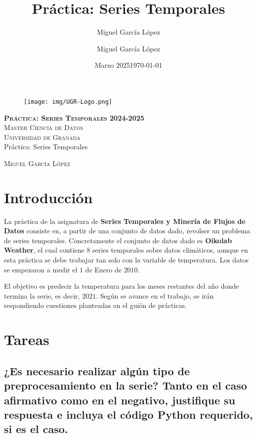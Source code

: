 \documentclass[12pt,letterpaper]{article}
\title{Práctica: Series Temporales}
\author{Miguel García López}
\date{Marzo 2025}
\author{Miguel García López} %
\date{\normalsize\today} %
\begin{document}
\begin{titlepage}
    \begin{figure}
        \vspace{-1.3cm}
        \begin{center}
            \texttt{[image: img/UGR-Logo.png]}
        \end{center}
    \end{figure}
    \vspace{1.3cm}
    \centering
    \normalfont \normalsize
    \textsc{\textbf{Práctica: Series Temporales 2024-2025} \\ \vspace{.15cm} Master Ciencia de Datos\\ \vspace{.15cm} Universidad de Granada} \\ [25pt]
    \huge Práctica: Series Temporales

    \normalfont \normalsize \vspace{.30cm}
    \textsc{Miguel García López}

\end{titlepage}

\tableofcontents
\listoffigures
\listoftables
\newpage

\section{Introducción}
La práctica de la asignatura de \textbf{Series Temporales y Minería de Flujos de Datos} consiste en, a partir de una conjunto de datos dado, revolser un problema de series temporales. Concretamente el conjunto de datos dado es \textbf{Oikolab Weather}, el cual contiene $8$ series temporales sobre datos climáticos, aunque en esta práctica se debe trabajar tan solo con la variable de temperatura. Los datos se empezaron a medir el $1$ de Enero de $2010$.

El objetivo es predecir la temperatura para los meses restantes del año donde termina la serie, es decir, $2021$. Según se avance en el trabajo, se irán respondiendo cuestiones planteadas en el guión de prácticas.

\section{Tareas}
\subsection{¿Es necesario realizar algún tipo de preprocesamiento en la serie? Tanto en el caso
afirmativo como en el negativo, justifique su respuesta e incluya el código Python
requerido, si es el caso.}
\end{document}
